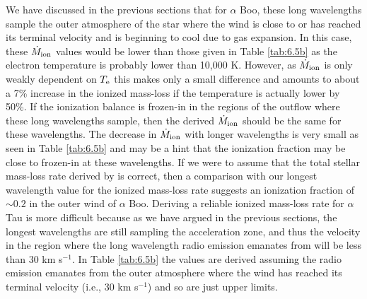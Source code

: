 We have discussed in the previous sections that for $\alpha$ Boo, these long wavelengths sample the outer atmosphere of the star where the wind  is close to or has reached its terminal velocity and is beginning to cool due to gas expansion. In this case, these $\dot{M}_{\rm{ion}}$ values would be lower than those given in Table \ref{tab:6.5b} as the electron temperature is probably lower than 10,000 K. However, as $\dot{M}_{\rm{ion}}$  is only weakly dependent on $T_{\rm{e}}$ this makes only a small difference and amounts to about a 7\% increase in the ionized mass-loss if the temperature is actually lower by 50\%. If the ionization balance is frozen-in in the regions of the outflow where these long wavelengths sample, then the derived $\dot{M}_{\rm{ion}}$ should be the same for these wavelengths. The decrease in $\dot{M}_{\rm{ion}}$ with longer wavelengths is very small as seen in Table \ref{tab:6.5b} and may be a hint that the ionization fraction may be close to frozen-in at these wavelengths. If we were to assume that the total stellar mass-loss rate derived by \cite{drake_1985} is correct, then a comparison with our longest wavelength value for the ionized mass-loss rate suggests an ionization fraction of $\sim 0.2$ in the outer wind of $\alpha$ Boo. Deriving a reliable ionized mass-loss rate for $\alpha$ Tau is more difficult because as we have argued in the previous sections, the longest wavelengths are still sampling the acceleration zone, and thus the velocity in the region where the long wavelength radio emission emanates from will be less than 30 km s$^{-1}$. In Table \ref{tab:6.5b} the values are derived assuming the radio emission emanates from the outer atmosphere where the wind has reached its terminal velocity (i.e., 30 km s$^{-1}$) and so are just upper limits.